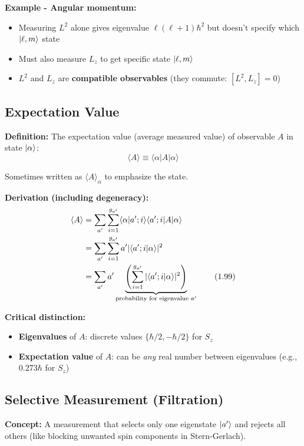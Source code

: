 \documentclass[11pt,a4paper]{article}
\begin{document}
\textbf{Example - Angular momentum:}
\begin{itemize}
\item Measuring $L^2$ alone gives eigenvalue $\ell(\ell+1)\hbar^2$ but doesn't specify which $\ket{\ell, m}$ state
\item Must also measure $L_z$ to get specific state $\ket{\ell, m}$
\item $L^2$ and $L_z$ are \textbf{compatible observables} (they commute: $[L^2, L_z] = 0$)
\end{itemize}

\subsection{Expectation Value}

\textbf{Definition:} The expectation value (average measured value) of observable $A$ in state $\ket{\alpha}$:
\begin{equation}
\boxed{\langle A \rangle \equiv \langle\alpha|A|\alpha\rangle}
\tag{1.98}
\end{equation}

Sometimes written as $\langle A \rangle_\alpha$ to emphasize the state.

\textbf{Derivation (including degeneracy):} 
\begin{align}
\langle A \rangle &= \sum_{a'} \sum_{i=1}^{g_{a'}} \langle\alpha|a'; i\rangle\langle a'; i|A|\alpha\rangle \notag \\
&= \sum_{a'} \sum_{i=1}^{g_{a'}} a' |\langle a'; i|\alpha\rangle|^2 \notag \\
&= \sum_{a'} a' \underbrace{\left(\sum_{i=1}^{g_{a'}}|\langle a'; i|\alpha\rangle|^2\right)}_{\text{probability for eigenvalue } a'}
\tag{1.99}
\end{align}

\textbf{Critical distinction:} 
\begin{itemize}
\item \textbf{Eigenvalues} of $A$: discrete values $\{\hbar/2, -\hbar/2\}$ for $S_z$
\item \textbf{Expectation value} of $A$: can be \textit{any} real number between eigenvalues (e.g., $0.273\hbar$ for $S_z$)
\end{itemize}

\subsection{Selective Measurement (Filtration)}

\textbf{Concept:} A measurement that selects only one eigenstate $\ket{a'}$ and rejects all others (like blocking unwanted spin components in Stern-Gerlach).
\end{document}
